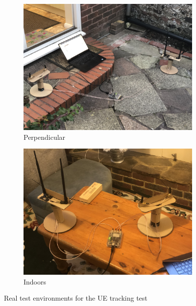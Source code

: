 \documentclass[12pt,a4paper]{report}
\begin{document}
\begin{figure}[h]
    \begin{subfigure}{0.45\textwidth}
        \centering
        \includegraphics[width = \textwidth]{Figures/test_ue_perpendicular.jpg}
        \caption{Perpendicular}
        \label{fig:test:ue:env:perp}
    \end{subfigure}
    \hfill
    \begin{subfigure}{0.45\textwidth}
        \centering
        \includegraphics[width = \textwidth]{Figures/test_ue_indoors.jpg}
        \caption{Indoors}
        \label{fig:test:ue:env:ind}
    \end{subfigure}
    \caption{Real test environments for the UE tracking test}
    \label{fig:test:ue:env}
\end{figure}
\end{document}
